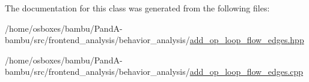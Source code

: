 The documentation for this class was generated from the following files\+:\begin{DoxyCompactItemize}
\item 
/home/osboxes/bambu/\+Pand\+A-\/bambu/src/frontend\+\_\+analysis/behavior\+\_\+analysis/\hyperlink{add__op__loop__flow__edges_8hpp}{add\+\_\+op\+\_\+loop\+\_\+flow\+\_\+edges.\+hpp}\item 
/home/osboxes/bambu/\+Pand\+A-\/bambu/src/frontend\+\_\+analysis/behavior\+\_\+analysis/\hyperlink{add__op__loop__flow__edges_8cpp}{add\+\_\+op\+\_\+loop\+\_\+flow\+\_\+edges.\+cpp}\end{DoxyCompactItemize}
